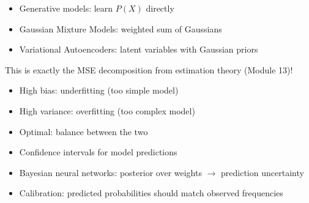 
\begin{itemize}
\tightlist
\item
  Generative models: learn $P(X)$ directly
\item
  Gaussian Mixture Models: weighted sum of Gaussians
\item
  Variational Autoencoders: latent variables with Gaussian priors
\end{itemize}



This is exactly the MSE decomposition from estimation theory (Module 13)!

\begin{itemize}
\tightlist
\item
  High bias: underfitting (too simple model)
\item
  High variance: overfitting (too complex model)
\item
  Optimal: balance between the two
\end{itemize}


\begin{itemize}
\tightlist
\item
  Confidence intervals for model predictions
\item
  Bayesian neural networks: posterior over weights \ensuremath{\to} prediction uncertainty
\item
  Calibration: predicted probabilities should match observed frequencies
\end{itemize}


